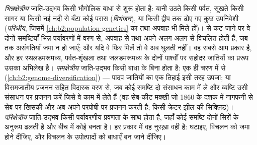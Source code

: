 \begin{proposition}[जाति-उद्भव के प्रकार]\label{prop:b2:speciation:modes}
\emph{भिन्नक्षेत्रीय} जाति-उद्भव किसी भौगोलिक बाधा से शुरू होता है:
यानी उठते किसी पर्वत, सूखते किसी सागर या किसी नई नदी से बँटा कोई परास
(\emph{विभंजन}), या किसी द्वीप तक ढोए गए कुछ उपनिवेशी
(\emph{परिधीय}, जिसमें \cref{ch:b2:population-genetics} का
 तथा अपवाह भी मिले हों)।  से कट जाने पर
वे दोनों समष्टियाँ भिन्न पर्यावरणों में वरण से,
अपवाह से तथा अपने अलग-अलग  से विचलित होती हैं, जब तक असंगतियाँ
जमा न हो जाएँ; और यदि वे फिर मिलें तो वे अब घुलती नहीं। वह
सबसे आम प्रकार है, और हर स्थलडमरूमध्य, पर्वत-शृंखला तथा जलडमरूमध्य के दोनों
पार्श्वों पर सहोदर जातियों का प्ररूप उसका अभिलेख है।
\emph{समक्षेत्रीय} जाति-उद्भव किसी बाधा के बिना होता है: एक ही चरण में
 से (\cref{ch:b2:genome-diversification}) --- पादप जातियों का
एक तिहाई इसी तरह उपजा; या विसमजातीय प्रजनन सहित विदारक वरण से,
जब कोई समष्टि दो संसाधन काम में ले और
व्यष्टि उसी संसाधन पर प्रजनन करें जिसे वे काम में लेते हैं (वह सेब-कीट मक्खी
जो 1860 के दशक में नागफनी से सेब पर खिसकी और अब
अपने परपोषी पर प्रजनन करती है; किसी क्रेटर-झील की सिक्लिड)। \emph{परिक्षेत्रीय}
जाति-उद्भव किसी पर्यावरणीय प्रवणता के साथ होता है, जहाँ कोई
समष्टि दोनों सिरों के अनुरूप ढलती है और बीच में कोई 
बनता है। हर प्रकार में वह नुस्ख़ा वही है:  घटाइए,
विचलन को जमा होने दीजिए, और विचलन के उपोत्पादों को
बाधाएँ बन जाने दीजिए।
\end{proposition}

